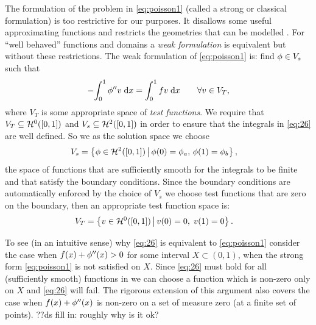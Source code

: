 The formulation of the problem in \cref{eq:poisson1} (called a strong or classical formulation) is too restrictive for our purposes.
It disallows some useful approximating functions and restricts the geometries that can be modelled \cite[14]{HowardElmanDavidSilvester2006}.
For ``well behaved'' functions and domains a \emph{weak formulation} is equivalent but without these restrictions.
The weak formulation of \cref{eq:poisson1} is: find $\phi\in V_{s}$ such that
\begin{equation}
  -{\int_0^1 \phi'' v {\; \mathrm{{d}}}{x}} = {\int_0^1 f v {\; \mathrm{{d}}}{x}} \qquad \forall v \in V_{T},
  \label{eq:26}
\end{equation}
where $V_{T}$ is some appropriate space of \emph{test functions}.
We require that $V_{T}\subseteq \mathcal{H}^0([0,1])$ and $V_s \subseteq \mathcal{H}^2([0,1])$ in order to ensure that the integrals in \cref{eq:26} are well defined.
So we as the solution space we choose
\begin{equation}
  \begin{aligned}
    V_{s} &= \left\{ {\phi \in \mathcal{H}^2([0,1])} \,\middle|\, {\phi(0) = \phi_{a},\, \phi(1) = \phi_{b}} \right\},
  \end{aligned}
\end{equation}
\ie the space of functions that are sufficiently smooth for the integrals to be finite and that satisfy the boundary conditions.
Since the boundary conditions are automatically enforced by the choice of $V_s$ we choose test functions that are zero on the boundary, then an appropriate test function space is:
\begin{equation}
  \label{eq:28}
  \begin{aligned}
    V_{T} &= \left\{ { v \in \mathcal{H}^0([0,1]) } \,\middle|\, { v(0) =0,\; v(1)=0 } \right\}.
  \end{aligned}
\end{equation}

To see (in an intuitive sense) why \cref{eq:26} is equivalent to \cref{eq:poisson1} consider the case when $f(x) + \phi''(x) > 0$ for some interval $X \subset (0,1)$, \ie when the strong form \cref{eq:poisson1} is not satisfied on $X$.
Since \cref{eq:26} must hold for all (sufficiently smooth) functions in we can choose a function which is non-zero only on $X$ and \cref{eq:26} will fail.
The rigorous extension of this argument also covers the case when $f(x) + \phi''(x)$ is non-zero on a set of measure zero (\eg at a finite set of points). ??ds fill in: roughly why is it ok?

